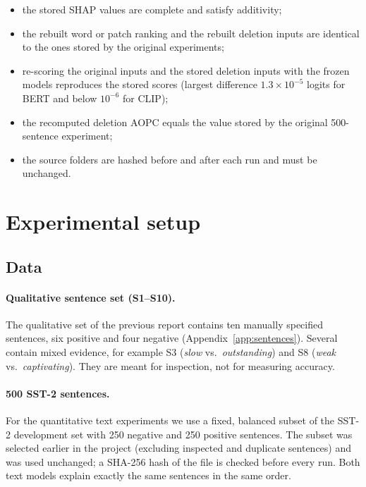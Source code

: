 \documentclass[11pt,a4paper]{article}
\begin{document}
\begin{itemize}[leftmargin=*]
  \item the stored SHAP values are complete and satisfy additivity;
  \item the rebuilt word or patch ranking and the rebuilt deletion inputs are identical to
        the ones stored by the original experiments;
  \item re-scoring the original inputs and the stored deletion inputs with the frozen
        models reproduces the stored scores (largest difference $1.3\times10^{-5}$ logits
        for BERT and below $10^{-6}$ for CLIP);
  \item the recomputed deletion AOPC equals the value stored by the original 500-sentence
        experiment;
  \item the source folders are hashed before and after each run and must be unchanged.
\end{itemize}

\section{Experimental setup}\label{sec:setup}

\subsection{Data}

\paragraph{Qualitative sentence set (S1--S10).} The qualitative set of the previous report
contains ten manually specified sentences, six positive and four negative
(Appendix~\ref{app:sentences}). Several contain mixed evidence, for example S3 (\emph{slow}
vs.\ \emph{outstanding}) and S8 (\emph{weak} vs.\ \emph{captivating}). They are meant for
inspection, not for measuring accuracy.

\paragraph{500 SST-2 sentences.} For the quantitative text experiments we use a fixed,
balanced subset of the SST-2 development set with 250 negative and 250 positive sentences.
The subset was selected earlier in the project (excluding inspected and duplicate
sentences) and was used unchanged; a SHA-256 hash of the file is checked before every run.
Both text models explain exactly the same sentences in the same order.
\end{document}
